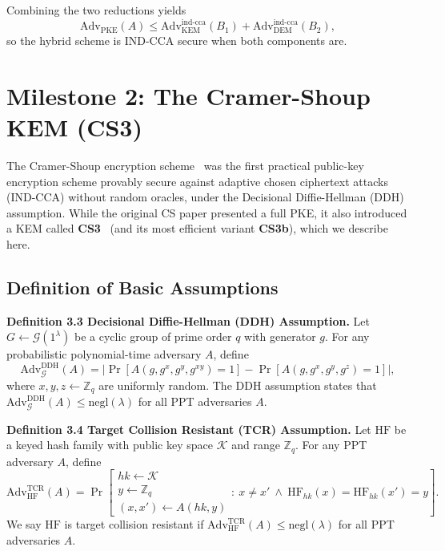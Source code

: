 Combining the two reductions yields
$$
\text{Adv}_{\text{PKE}}(A) \le \text{Adv}_{\text{KEM}}^{\text{ind-cca}}(B_1) + \text{Adv}_{\text{DEM}}^{\text{ind-cca}}(B_2),
$$
so the hybrid scheme is IND-CCA secure when both components are.

\section{Milestone 2: The Cramer-Shoup KEM (CS3)}

The Cramer-Shoup encryption scheme~\cite{cramer2003design} was the first practical public-key encryption scheme provably secure against adaptive chosen ciphertext attacks (IND-CCA) without random oracles, under the Decisional Diffie-Hellman (DDH) assumption. 
While the original CS paper presented a full PKE, it also introduced a KEM called \textbf{CS3}~\cite{cramer2003design} (and its most efficient variant \textbf{CS3b}), which we describe here.

\subsection{Definition of Basic Assumptions}

\noindent\textbf{Definition 3.3 Decisional Diffie-Hellman (DDH) Assumption.} Let $G \gets \mathcal{G}(1^\lambda)$ be a cyclic group of prime order $q$ with generator $g$. For any probabilistic polynomial-time adversary $A$, define
$$
\text{Adv}_{\mathcal{G}}^{\text{DDH}}(A) = \left| \Pr[A(g, g^x, g^y, g^{xy}) = 1] - \Pr[A(g, g^x, g^y, g^z) = 1] \right|,
$$
where $x, y, z \gets \mathbb{Z}_q$ are uniformly random. The DDH assumption states that $\text{Adv}_{\mathcal{G}}^{\text{DDH}}(A) \le \text{negl}(\lambda)$ for all PPT adversaries $A$.

\noindent\textbf{Definition 3.4 Target Collision Resistant (TCR) Assumption.} Let $\mathrm{HF}$ be a keyed hash family with public key space $\mathcal{K}$ and range $\mathbb{Z}_q$. For any PPT adversary $A$, define
$$
\text{Adv}_{\mathrm{HF}}^{\text{TCR}}(A) = \Pr\left[
\begin{matrix}
hk \gets \mathcal{K} \\
y \gets \mathbb{Z}_q \\
(x,x') \gets A(hk, y)
\end{matrix} : \ x \neq x' \ \land\ \mathrm{HF}_{hk}(x) = \mathrm{HF}_{hk}(x') = y
\right].
$$
We say $\mathrm{HF}$ is target collision resistant if $\text{Adv}_{\mathrm{HF}}^{\text{TCR}}(A) \le \text{negl}(\lambda)$ for all PPT adversaries $A$.

